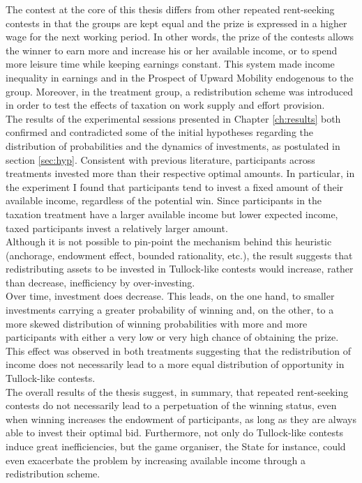 The contest at the core of this thesis differs from other repeated rent-seeking contests in that the groups are kept equal and the prize is expressed in a higher wage for the next working period. In other words, the prize of the contests allows the winner to earn more and increase his or her available income, or to spend more leisure time while keeping earnings constant. This system made income inequality in earnings and in the Prospect of Upward Mobility endogenous to the group. Moreover, in the treatment group, a redistribution scheme was introduced in order to test the effects of taxation on work supply and effort provision.\\

The results of the experimental sessions presented in Chapter \ref{ch:results} both confirmed and contradicted some of the initial hypotheses regarding the distribution of probabilities and the dynamics of investments, as postulated in section \ref{sec:hyp}. Consistent with previous literature, participants across treatments invested more than their respective optimal amounts. In particular, in the experiment I found that participants tend to invest a fixed amount of their available income, regardless of the potential win. Since participants in the taxation treatment have a larger available income but lower expected income, taxed participants invest a relatively larger amount.\\

Although it is not possible to pin-point the mechanism behind this heuristic (anchorage, endowment effect, bounded rationality, etc.), the result suggests that redistributing assets to be invested in Tullock-like contests would increase, rather than decrease, inefficiency by over-investing.\\  

Over time, investment does decrease. This leads, on the one hand, to smaller investments carrying a greater probability of winning and, on the other, to a more skewed distribution of winning probabilities with more and more participants with either a very low or very high chance of obtaining the prize. This effect was observed in both treatments suggesting that the redistribution of income does not necessarily lead to a more equal distribution of opportunity in Tullock-like contests.\\

The overall results of the thesis suggest, in summary, that repeated rent-seeking contests do not necessarily lead to a perpetuation of the winning status, even when winning increases the endowment of participants, as long as they are always able to invest their optimal bid. Furthermore, not only do Tullock-like contests induce great inefficiencies, but the game organiser, the State for instance, could even exacerbate the problem by increasing available income through a redistribution scheme.\\

